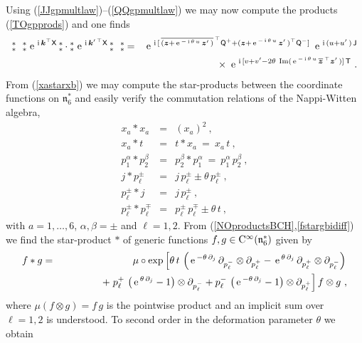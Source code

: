 \documentclass[11pt,a4paper]{article}
\newcommand{\NOa}{\mbox{$\substack{\ast\\\ast}$}}       %
\newcommand{\ii}{{\rm i}}
\newcommand{\mbf}[1]{{\boldsymbol {#1} }}
\def\ii{{\,{\rm i}\,}}
\def\CC{{\rm C}}
\def\T{{\sf T}}
\def\X{{\sf X}}
\def\Q{{\sf Q}}
\def\J{{\sf J}}
\def\mz{{\mbf z}}
\def\mk{{\mbf k}}
\def\mfn{{\mathfrak n}}
\def\e{{\,\rm e}\,}
\def\bea{\begin{eqnarray}}
\def\eea{\end{eqnarray}}
\begin{document}
Using (\ref{JJgpmultlaw})--(\ref{QQgpmultlaw}) we may now compute the
products (\ref{TOgpprods}) and one finds
\bea
\NOa~~\NOa\,\e^{\ii\mk^\top\X}\,\NOa\cdot\NOa\,\e^{\ii\mk^{\prime\,\top}\X}
\,\NOa~~\NOa&=&\e^{\ii[\,\overline{(\mz+\e^{-\ii\theta\,u}\,\mz'\,)}^{\,\top}
\Q^++(\mz+\e^{-\ii\theta\,u}\,\mz'\,)^\top\Q^-]}~\e^{\ii(u+u'\,)\,\J}
\nonumber\\&&\times~
\e^{\ii[v+v'-2\theta~{\rm Im}(\e^{-\ii\theta\,u}\,
\overline{\mz}^{\,\top}\mz'\,)]\,\T} \ .
\label{TOgpprodexpl}\eea
From (\ref{xastarxb}) we may compute the star-products between the
coordinate functions on $\mfn_6^*$ and easily verify the commutation
relations of the Nappi-Witten algebra,
\bea
x_a*x_a&=&(x_a)^2 \ , \nonumber\\x_a*t&=&t*x_a~=~x_a\,t \ ,
\nonumber\\p_1^\alpha*p_2^\beta&=&p_2^\beta*p_1^\alpha
~=~p_1^\alpha\,p_2^\beta \ , \nonumber\\
j*p_\ell^\pm&=&j\,p_\ell^\pm\pm\theta\,p_\ell^\pm \ , \nonumber\\
p_\ell^\pm*j&=&j\,p_\ell^\pm \ , \nonumber\\
p_\ell^\pm*p_\ell^\mp&=&p_\ell^\pm\,p_\ell^\mp\pm\theta\,t \ ,
\label{TOcoordstarprods}\eea
with $a=1,\dots,6$, $\alpha,\beta=\pm$ and $\ell=1,2$. From
(\ref{NOproductsBCH},\ref{fstargbidiff}) we find the star-product $*$
of generic functions $f,g\in\CC^{\infty}(\mfn_6^*)$ given by
\bea
f*g&=&\mu\circ\exp\left[\theta\,t\,\left(\e^{-\theta\,\partial_j}\,
\partial_{p_\ell^-}\otimes\partial_{p_\ell^+}-\e^{\theta\,\partial_j}\,
\partial_{p_\ell^+}\otimes\partial_{p_\ell^-}\right)\right.\nonumber
\\&&\qquad\qquad+\left.p_\ell^+\,\left(\e^{\theta\,\partial_j}-1\right)\otimes
\partial_{p_\ell^-}+p_\ell^-\,\left(\e^{-\theta\,\partial_j}-1\right)
\otimes\partial_{p_\ell^+}\right]f\otimes g \ ,
\label{TOstargen}\eea
where $\mu(f\otimes g)=f\,g$ is the pointwise product and an implicit
sum over $\ell=1,2$ is understood. To second order in the deformation
parameter $\theta$ we obtain
\end{document}
